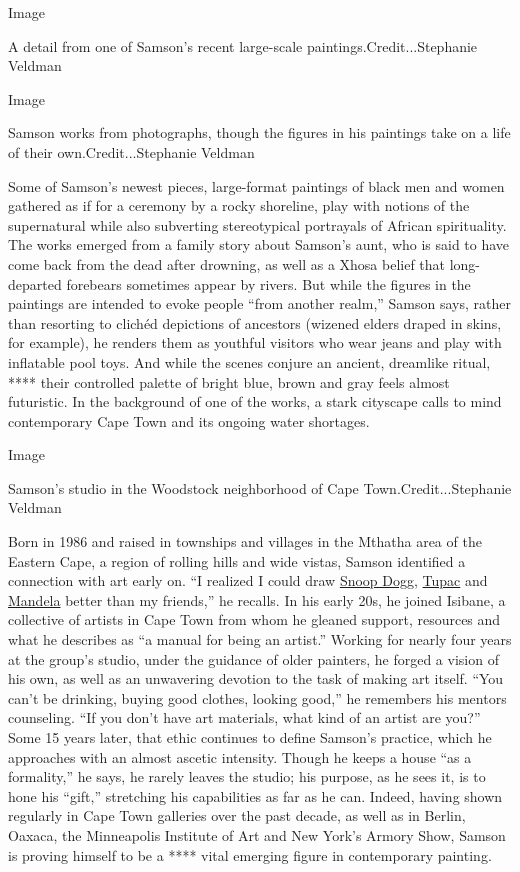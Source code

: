 Image

A detail from one of Samson's recent large-scale
paintings.Credit...Stephanie Veldman

Image

Samson works from photographs, though the figures in his paintings take
on a life of their own.Credit...Stephanie Veldman

Some of Samson's newest pieces, large-format paintings of black men and
women gathered as if for a ceremony by a rocky shoreline, play with
notions of the supernatural while also subverting stereotypical
portrayals of African spirituality. The works emerged from a family
story about Samson's aunt, who is said to have come back from the dead
after drowning, as well as a Xhosa belief that long-departed forebears
sometimes appear by rivers. But while the figures in the paintings are
intended to evoke people ``from another realm,'' Samson says, rather
than resorting to clichéd depictions of ancestors (wizened elders draped
in skins, for example), he renders them as youthful visitors who wear
jeans and play with inflatable pool toys. And while the scenes conjure
an ancient, dreamlike ritual, **** their controlled palette of bright
blue, brown and gray feels almost futuristic. In the background of one
of the works, a stark cityscape calls to mind contemporary Cape Town and
its ongoing water shortages.

Image

Samson's studio in the Woodstock neighborhood of Cape
Town.Credit...Stephanie Veldman

Born in 1986 and raised in townships and villages in the Mthatha area of
the Eastern Cape, a region of rolling hills and wide vistas, Samson
identified a connection with art early on. ``I realized I could draw
\href{https://www.nytimes3xbfgragh.onion/topic/person/snoop-dogg}{Snoop
Dogg},
\href{https://www.nytimes3xbfgragh.onion/topic/person/tupac-shakur}{Tupac}
and
\href{https://www.nytimes3xbfgragh.onion/topic/person/nelson-mandela}{Mandela}
better than my friends,'' he recalls. In his early 20s, he joined
Isibane, a collective of artists in Cape Town from whom he gleaned
support, resources and what he describes as ``a manual for being an
artist.'' Working for nearly four years at the group's studio, under the
guidance of older painters, he forged a vision of his own, as well as an
unwavering devotion to the task of making art itself. ``You can't be
drinking, buying good clothes, looking good,'' he remembers his mentors
counseling. ``If you don't have art materials, what kind of an artist
are you?'' Some 15 years later, that ethic continues to define Samson's
practice, which he approaches with an almost ascetic intensity. Though
he keeps a house ``as a formality,'' he says, he rarely leaves the
studio; his purpose, as he sees it, is to hone his ``gift,'' stretching
his capabilities as far as he can. Indeed, having shown regularly in
Cape Town galleries over the past decade, as well as in Berlin, Oaxaca,
the Minneapolis Institute of Art and New York's Armory Show, Samson is
proving himself to be a **** vital emerging figure in contemporary
painting.

